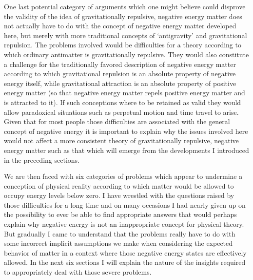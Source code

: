 \documentclass[notitlepage,12pt]{report}
\begin{document}
One last potential category of arguments which one might believe could disprove the validity of the idea of gravitationally repulsive, negative energy matter does not actually have to do with the concept of negative energy matter developed here, but merely with more traditional concepts of `antigravity' and gravitational repulsion. The problems involved would be difficulties for a theory according to which ordinary antimatter is gravitationally repulsive. They would also constitute a challenge for the traditionally favored description of negative energy matter according to which gravitational repulsion is an absolute property of negative energy itself, while gravitational attraction is an absolute property of positive energy matter (so that negative energy matter repels positive energy matter and is attracted to it). If such conceptions where to be retained as valid they would allow paradoxical situations such as perpetual motion and time travel to arise. Given that for most people those difficulties are associated with the general concept of negative energy it is important to explain why the issues involved here would not affect a more consistent theory of gravitationally repulsive, negative energy matter such as that which will emerge from the developments I introduced in the preceding sections.

We are then faced with six categories of problems which appear to undermine a conception of physical reality according to which matter would be allowed to occupy energy levels below zero. I have wrestled with the questions raised by those difficulties for a long time and on many occasions I had nearly given up on the possibility to ever be able to find appropriate answers that would perhaps explain why negative energy is not an inappropriate concept for physical theory. But gradually I came to understand that the problems really have to do with some incorrect implicit assumptions we make when considering the expected behavior of matter in a context where those negative energy states are effectively allowed. In the next six sections I will explain the nature of the insights required to appropriately deal with those severe problems.
\end{document}
